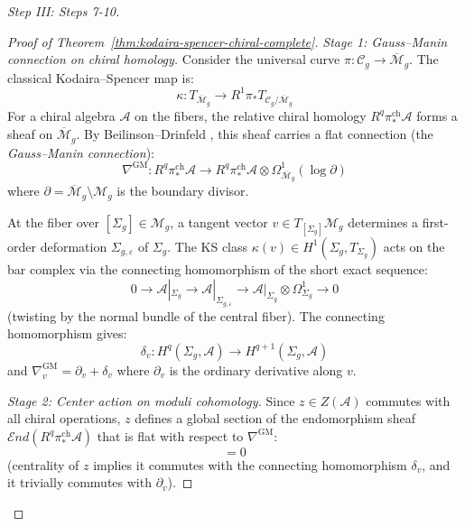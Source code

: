\begin{proof}[Step III: Steps 7-10]
\begin{proof}[Proof of Theorem~\ref{thm:kodaira-spencer-chiral-complete}]
\emph{Stage 1: Gauss--Manin connection on chiral homology.}
Consider the universal curve $\pi: \mathcal{C}_g \to \overline{\mathcal{M}}_g$.
The classical Kodaira--Spencer map is:
\begin{equation}
\kappa: T_{\overline{\mathcal{M}}_g} \to R^1\pi_* T_{\mathcal{C}_g/\overline{\mathcal{M}}_g}
\end{equation}
For a chiral algebra $\mathcal{A}$ on the fibers, the relative chiral homology
$R^q\pi_*^{\mathrm{ch}} \mathcal{A}$ forms a sheaf on $\overline{\mathcal{M}}_g$.
By Beilinson--Drinfeld \cite[Theorem 4.6.1]{BD04}, this sheaf carries a flat
connection (the \emph{Gauss--Manin connection}):
\begin{equation}
\nabla^{\mathrm{GM}}: R^q\pi_*^{\mathrm{ch}} \mathcal{A} \to
R^q\pi_*^{\mathrm{ch}} \mathcal{A} \otimes \Omega^1_{\overline{\mathcal{M}}_g}(\log \partial)
\end{equation}
where $\partial = \overline{\mathcal{M}}_g \setminus \mathcal{M}_g$ is the boundary
divisor.

At the fiber over $[\Sigma_g] \in \mathcal{M}_g$, a tangent vector $v \in
T_{[\Sigma_g]}\mathcal{M}_g$ determines a first-order deformation $\Sigma_{g,\varepsilon}$
of $\Sigma_g$.  The KS class $\kappa(v) \in H^1(\Sigma_g, T_{\Sigma_g})$ acts on the
bar complex via the connecting homomorphism of the short exact sequence:
\begin{equation}
0 \to \mathcal{A}|_{\Sigma_g} \to \mathcal{A}|_{\Sigma_{g,\varepsilon}} \to
\mathcal{A}|_{\Sigma_g} \otimes \Omega^1_{\Sigma_g} \to 0
\end{equation}
(twisting by the normal bundle of the central fiber).  The connecting homomorphism gives:
\begin{equation}
\delta_v: H^q(\Sigma_g, \mathcal{A}) \to H^{q+1}(\Sigma_g, \mathcal{A})
\end{equation}
and $\nabla_v^{\mathrm{GM}} = \partial_v + \delta_v$ where $\partial_v$ is the
ordinary derivative along $v$.

\emph{Stage 2: Center action on moduli cohomology.}
Since $z \in Z(\mathcal{A})$ commutes with all chiral operations, $z$ defines a
global section of the endomorphism sheaf
$\mathcal{E}nd(R^q\pi_*^{\mathrm{ch}}\mathcal{A})$ that is flat with respect to
$\nabla^{\mathrm{GM}}$:
\begin{equation}
[\nabla^{\mathrm{GM}}, \rho(z)] = 0
\end{equation}
(centrality of $z$ implies it commutes with the connecting homomorphism $\delta_v$,
and it trivially commutes with $\partial_v$).


\end{proof}
\end{proof}
